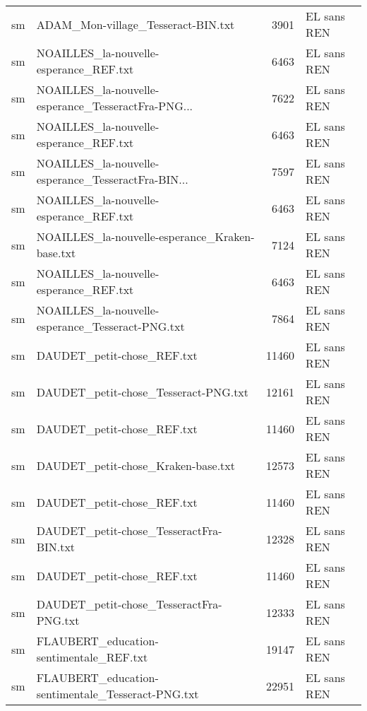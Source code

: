 \begin{tabular}{llrl}
    sm &                 ADAM\_Mon-village\_Tesseract-BIN.txt &                  3901 & EL sans REN \\
    sm &             NOAILLES\_la-nouvelle-esperance\_REF.txt &                  6463 & EL sans REN \\
    sm & NOAILLES\_la-nouvelle-esperance\_TesseractFra-PNG... &                  7622 & EL sans REN \\
    sm &             NOAILLES\_la-nouvelle-esperance\_REF.txt &                  6463 & EL sans REN \\
    sm & NOAILLES\_la-nouvelle-esperance\_TesseractFra-BIN... &                  7597 & EL sans REN \\
    sm &             NOAILLES\_la-nouvelle-esperance\_REF.txt &                  6463 & EL sans REN \\
    sm &     NOAILLES\_la-nouvelle-esperance\_Kraken-base.txt &                  7124 & EL sans REN \\
    sm &             NOAILLES\_la-nouvelle-esperance\_REF.txt &                  6463 & EL sans REN \\
    sm &   NOAILLES\_la-nouvelle-esperance\_Tesseract-PNG.txt &                  7864 & EL sans REN \\
    sm &                         DAUDET\_petit-chose\_REF.txt &                 11460 & EL sans REN \\
    sm &               DAUDET\_petit-chose\_Tesseract-PNG.txt &                 12161 & EL sans REN \\
    sm &                         DAUDET\_petit-chose\_REF.txt &                 11460 & EL sans REN \\
    sm &                 DAUDET\_petit-chose\_Kraken-base.txt &                 12573 & EL sans REN \\
    sm &                         DAUDET\_petit-chose\_REF.txt &                 11460 & EL sans REN \\
    sm &            DAUDET\_petit-chose\_TesseractFra-BIN.txt &                 12328 & EL sans REN \\
    sm &                         DAUDET\_petit-chose\_REF.txt &                 11460 & EL sans REN \\
    sm &            DAUDET\_petit-chose\_TesseractFra-PNG.txt &                 12333 & EL sans REN \\
    sm &            FLAUBERT\_education-sentimentale\_REF.txt &                 19147 & EL sans REN \\
    sm &  FLAUBERT\_education-sentimentale\_Tesseract-PNG.txt &                 22951 & EL sans REN \\

\end{tabular}
